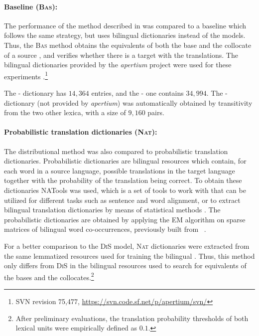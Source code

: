\documentclass[output=paper
,modfonts
,nonflat]{langsci/langscibook}
\begin{document}
\paragraph*{Baseline (\textsc{Bas}):} The performance of the method described in 
was compared to a baseline which follows the same strategy, but uses bilingual
dictionaries instead of the  models. Thus, the \textsc{Bas} method obtains the
equivalents of both the base and the collocate of a source ,
and verifies whether there is a target  with the translations. The bilingual
dictionaries provided by the \emph{apertium} project were used for
these experiments \citep{apertium}.\footnote{SVN revision 75,477, \scriptsize{\url{https://svn.code.sf.net/p/apertium/svn/}}}

The - dictionary has $14,364$ entries, and the - one
contains $34,994$. The - dictionary (not provided by \emph{apertium})
was automatically obtained by transitivity from the two other lexica, with
a size of $9,160$ pairs.

\paragraph*{Probabilistic translation dictionaries (\textsc{Nat}):} The distributional method
was also compared to probabilistic translation dictionaries. Probabilistic dictionaries are
bilingual resources which contain, for each word in a source language, possible translations
in the target language together with the probability of the translation being correct.
To obtain these dictionaries NATools was used, which is a set of tools to work with 
that can be utilized for different tasks such as sentence and word alignment, or to extract bilingual
translation dictionaries by means of statistical methods \citep{natools}. The probabilistic dictionaries
are obtained by applying the EM algorithm on sparse matrices of bilingual word co-occurrences, previously
built from ~\citep{hiemstra1998}.

For a better comparison to the \textsc{DiS} model, \textsc{Nat} dictionaries were
extracted from the same lemmatized resources used for training the bilingual .
Thus, this method only differs from \textsc{DiS} in the bilingual resources used to
search for equivalents of the bases and the collocates.\footnote{After preliminary
  evaluations, the translation probability thresholds of both lexical units were empirically defined as $0.1$.}
\end{document}
